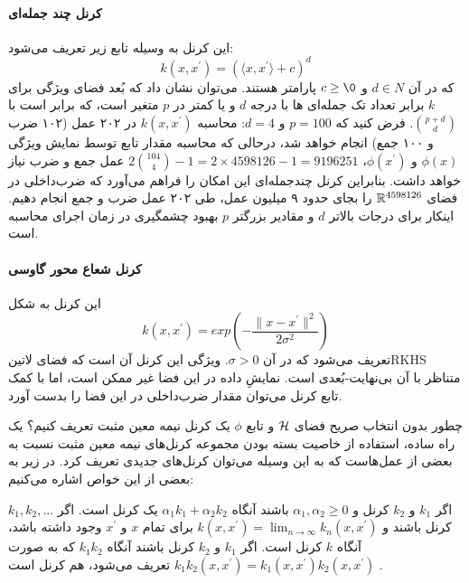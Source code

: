 \paragraph{کرنل چند جمله‌ای}
این کرنل به وسیله تابع زیر تعریف می‌شود:
\begin{equation*}
k(x,x^\prime) = (\langle{x,x^\prime}\rangle + c)^d
\end{equation*}
که در آن $d \in N$ و $c \geq \0 $ پارامتر هستند. می‌توان نشان داد که بُعد فضای ویژگی برای $k$ برابر تعداد تک جمله‌ای ها با درجه $d$ و یا کمتر در $p$ متغیر است، که برابر است با $p+d\choose d$. فرض کنید که $ p = 100 $ و $ d = 4 $: محاسبه $k(x,x^\prime)$ در ۲۰۲ عمل (۱۰۲ ضرب و ۱۰۰ جمع) انجام خواهد شد، درحالی که محاسبه مقدار تابع توسط نمایش ویژگی $\phi(x)$ و $ \phi(x^\prime) $، 
$2{104\choose 4} - 1 = 2\times 4598126−1 = 9196251$ عمل جمع و ضرب نیاز خواهد داشت. بنابراین کرنل چندجمله‌ای این امکان را فراهم می‌آورد که ضرب‌داخلی در فضای 
$\mathbb{R}^{4598126}$  را بجای حدود ۹ میلیون عمل، طی ۲۰۲ عمل ضرب و جمع انجام دهیم.
اینکار برای درجات بالاتر $d$ و مقادیر بزرگتر $p$ بهبود چشمگیری در زمان اجرای محاسبه است.

\paragraph{کرنل شعاع محور گاوسی}
 این کرنل به شکل 
\begin{equation}\label{eq:gaussian-kernel}
k(x,x^\prime) = exp(-\dfrac{\|x - x^\prime\|^2}{2\sigma^2})
\end{equation}
تعریف می‌شود که در آن $\sigma > 0$. ویژگی این کرنل آن است که فضای ‌لاتین{RKHS} متناظر با آن بی‌نهایت-بُعدی است. نمایشِ داده در این فضا غیر ممکن است، اما با کمک تابع کرنل می‌توان مقدار ضرب‌داخلی در این فضا را بدست آورد.

چطور بدون انتخاب صریح فضای $\mathcal{H}$ و تابع $\phi$ یک کرنل نیمه معین مثبت تعریف کنیم؟ یک راه ساده، استفاده از خاصیت بسته بودن مجموعه کرنل‌های نیمه معین مثبت نسبت به بعضی از عمل‌هاست که به این وسیله می‌توان کرنل‌های جدیدی تعریف کرد. در زیر به بعضی از این خواص اشاره می‌کنیم:

\begin{itemize}
 اگر $k_1$ و $k_2$ کرنل و 
$\alpha_1,\alpha_2 \geq 0$ باشند
 آنگاه $\alpha_1k_1 + \alpha_2k_2$ یک کرنل است.
 اگر $k_1,k_2,...$ کرنل باشند و 
$k(x,x^\prime) = \lim_{n \to \infty}k_n(x,x^\prime)$
برای تمام $x$ و $x^\prime$ وجود داشته باشد، آنگاه $k$ کرنل است.
 اگر $k_1$ و $k_2$ کرنل باشند آنگاه $k_1k_2$ که به صورت 
$k_1k_2(x,x^\prime) = k_1(x,x^\prime)k_2(x,x^\prime)$ تعریف می‌شود، هم کرنل است .
\end{itemize}

